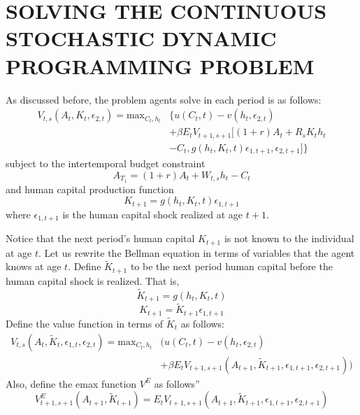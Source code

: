 \documentclass{article}
\begin{document}
\section{SOLVING THE CONTINUOUS STOCHASTIC DYNAMIC PROGRAMMING PROBLEM}
\label{section:solving}
As discussed before, the problem agents solve in each period is as follows:
\begin{equation} \tag{5'}
  \begin{split}
      V_{t,s}(A_t,K_t,\epsilon_{2,t})=\text{max}_{C_t,h_t} & \{u(C_t,t)-v(h_t, \epsilon_{2,t}) \\ & + \beta E_t V_{t+1,s+1}[(1+r)A_t + R_s K_t h_t \\ & -C_t, g(h_t,K_t,t)\epsilon_{1,t+1}, \epsilon_{2,t+1}]\}
  \end{split}
\end{equation}
subject to the intertemporal budget constraint
\begin{equation} \tag{2}
  \label{eq:bc}
  A_{T_1}=(1+r)A_t + W_{t,s} h_t - C_t
\end{equation}
and human capital production function
\begin{equation} \tag{4}
  K_{t+1} = g(h_t, K_t, t) \epsilon_{1,t+1}
\end{equation}
where $\epsilon_{1,t+1}$ is the human capital shock realized at age $t+1$.\par
Notice that the next period's human capital $K_{t+1}$ is not known to the individual at age $t$. Let us rewrite the Bellman equation in terms of variables that the agent knows at age $t$. Define $\tilde{K}_{t+1}$ to be the next period human capital before the human capital shock is realized. That is,
\begin{equation*}
  \tilde{K}_{t+1} = g(h_t, K_t,t)
\end{equation*}
\begin{equation*}
  K_{t+1} =  \tilde{K}_{t+1} \epsilon_{1,t+1}
\end{equation*}
Define the value function in terms of $ \tilde{K}_t$ as follows:
\begin{equation*}
  \begin{split}
      V_{t,s}(A_t,\tilde{K}_t,\epsilon_{1,t},\epsilon_{2,t})=\text{max}_{C_t,h_t} & (u(C_t,t)-v(h_t, \epsilon_{2,t}) \\ & + \beta E_t V_{t+1,s+1} (A_{t+1},\tilde{K}_{t+1},\epsilon_{1,t+1},\epsilon_{2,t+1}))
  \end{split}
\end{equation*}
Also, define the emax function $V^E$ as follows''
\begin{equation*}
V^E_{t+1,s+1}(A_{t+1},\tilde{K}_{t+1}) = E_t V_{t+1,s+1}(A_{t+1},\tilde{K}_{t+1},\epsilon_{1,t+1},\epsilon_{2,t+1}) 
\end{equation*}
\end{document}
